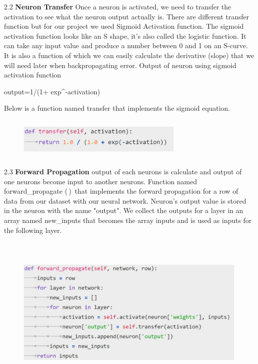 2.2 \textbf{Neuron Transfer}
Once a neuron is activated, we need to transfer the activation to see what the neuron output actually is.
There are different transfer function but for our project we used Sigmoid Activation function.\newline
The sigmoid activation function looks like an S shape, it’s also called the logistic function. It can take any input value and produce a number between 0 and 1 on an S-curve. It is also a function of which we can easily calculate the derivative (slope) that we will need later when backpropagating error.
\newline
Output of neuron using sigmoid activation function \newline
{output=1/(1+ exp^{-activation})

Below is a function named transfer that implements the sigmoid equation.

\begin{figure}[H]
\begin{center}
\includegraphics[width=80mm,height=20mm]{backexplain/transfer.jpg}
\end{center}
     
\end{figure} 

2.3 \textbf{Forward Propagation}
output of each neurons is calculate and output of one neurons become input to another neurons.\newline
Function named forward\_propagate (\,)\, that implements the forward propagation for a row of data from our dataset with our neural network.
Neuron’s output value is stored in the neuron with the name "output". We collect the outputs for a layer in an array named new\_inputs that becomes the array inputs and is used as inputs for the following layer.

\begin{figure}[H]
\begin{center}
\includegraphics[width=160mm,height=75mm]{backexplain/forward.jpg}
\end{center}
\end{figure} 

}
